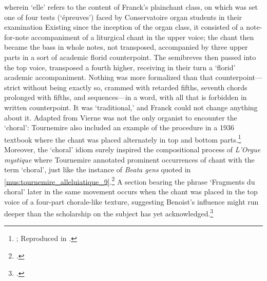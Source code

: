   {\cite[22]{VierneMessouvenirs1970} wherein `elle' refers to the content of Franck's plainchant class, on which was set one of four tests (`épreuves') faced by Conservatoire organ students in their examination}
{Existing since the inception of the organ class, it consisted of a note-for-note accompaniment of a liturgical chant in the upper voice; the chant then became the bass in whole notes, not transposed, accompanied by three upper parts in a sort of academic florid counterpoint. The semibreves then passed into the top voice, transposed a fourth higher, receiving in their turn a `florid' academic accompaniment. Nothing was more formalized than that counterpoint---strict without being exactly so, crammed with retarded fifths, seventh chords prolonged with fifths, and sequences---in a word, with all that is forbidden in written counterpoint. It was `traditional,' and Franck could not change anything about it.}
  {Adapted from \cite[pp.~41, 43]{SmithLouisVierneOrganist2009}}
\noindent
{}%
Vierne was not the only organist to encounter the `choral': Tournemire also included an example of the procedure in a 1936 textbook where the chant was placed alternately in top and bottom parts.\footnote{\cite[105]{TournemirePrecisexecutionregistration1936}; Reproduced in \cite[40]{SmithLouisVierneOrganist2009}.}
Moreover, the `choral' idiom surely inspired the compositional process of \emph{L'Orgue mystique} where Tournemire annotated prominent occurrences of chant with the term `choral', just like the instance of \emph{Beata gens} quoted in \cref{mus:tournemire_alleluiatique_9}.\footcites[9]{TournemireDominicaXVIIpost1932}[265]{GotlundGuideChantCharles2015}
A section bearing the phrase `Fragments du choral' later in the same movement occurs when the chant was placed in the top voice of a four-part chorale-like texture, suggesting Benoist's influence might run deeper than the scholarship on the subject has yet acknowledged.\footcite[David Connolly, whose study relies chiefly on Anglophone literature, does not engage with the `choral' idiom in Tournemire. Nevertheless, see][194--215]{ConnollyInfluencePlainchantFrench2013}

